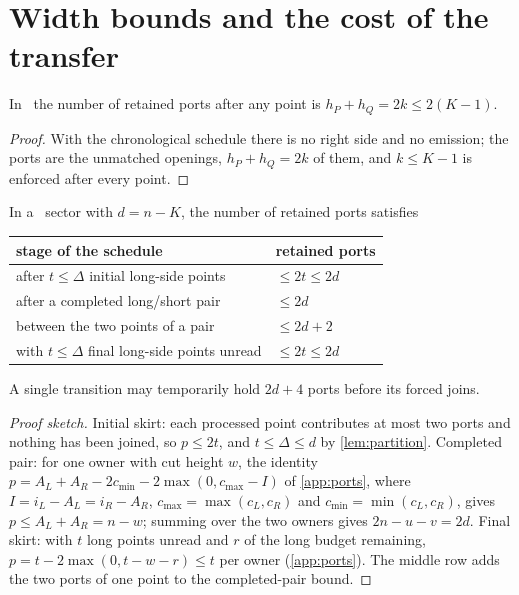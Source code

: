 \section{Width bounds and the cost of the transfer}
\label{sec:width}

\begin{lemma}
\label{lem:lowwidth}
\leanok
{}
In \LOW\ the number of retained ports after any point is
$h_P+h_Q=2k\le2(K-1)$.
\end{lemma}

\begin{proof}
\leanok
With the chronological schedule there is no right side and no emission; the
ports are the unmatched openings, $h_P+h_Q=2k$ of them, and $k\le K-1$ is
enforced after every point.
\end{proof}

\begin{lemma}
\label{lem:highwidth}
\leanok
{}
In a \HIGH\ sector with $d=n-K$, the number of retained ports satisfies
\begin{center}
\begin{tabular}{ll}
\toprule
stage of the schedule & retained ports \\
\midrule
after $t\le\Delta$ initial long-side points & $\le2t\le2d$ \\
after a completed long/short pair & $\le2d$ \\
between the two points of a pair & $\le2d+2$ \\
with $t\le\Delta$ final long-side points unread & $\le2t\le2d$ \\
\bottomrule
\end{tabular}
\end{center}
A single transition may temporarily hold $2d+4$ ports before its forced joins.
\end{lemma}

\begin{proof}[Proof sketch]
\leanok
Initial skirt: each processed point contributes at most two ports and nothing
has been joined, so $p\le2t$, and $t\le\Delta\le d$ by \cref{lem:partition}.
Completed pair: for one owner with cut height $w$, the identity
$p=A_L+A_R-2c_{\min}-2\max(0,c_{\max}-I)$ of \cref{app:ports}, where
$I=i_L-A_L=i_R-A_R$, $c_{\max}=\max(c_L,c_R)$ and $c_{\min}=\min(c_L,c_R)$,
gives $p\le A_L+A_R=n-w$; summing over the two owners gives $2n-u-v=2d$. Final skirt: with $t$ long points unread and
$r$ of the long budget remaining, $p=t-2\max(0,t-w-r)\le t$ per owner
(\cref{app:ports}). The middle row adds the two ports of one point to the
completed-pair bound.
\end{proof}

